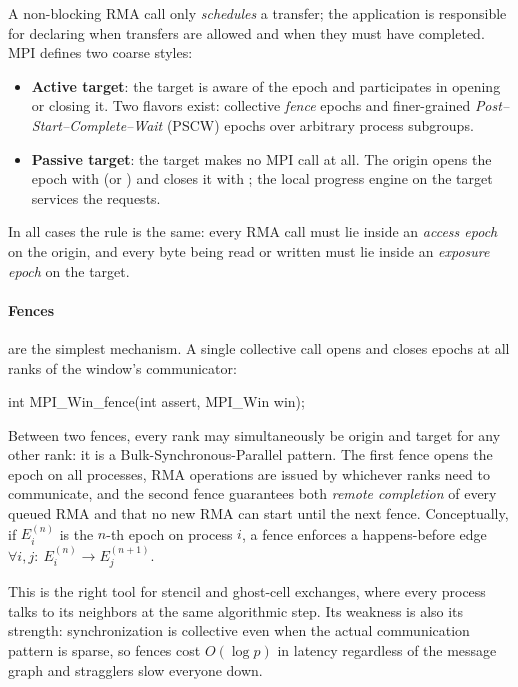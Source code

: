 A non-blocking RMA call only \emph{schedules} a transfer; the application is responsible for declaring when transfers are allowed and when they must have completed. MPI defines two coarse styles:

\begin{itemize}
    \item \textbf{Active target}: the target is aware of the epoch and participates in opening or closing it. Two flavors exist: collective \emph{fence} epochs and finer-grained \emph{Post--Start--Complete--Wait} (PSCW) epochs over arbitrary process subgroups.
    \item \textbf{Passive target}: the target makes no MPI call at all. The origin opens the epoch with  (or ) and closes it with ; the local progress engine on the target services the requests.
\end{itemize}

In all cases the rule is the same: every RMA call must lie inside an \emph{access epoch} on the origin, and every byte being read or written must lie inside an \emph{exposure epoch} on the target.

\paragraph{Fences} are the simplest mechanism. A single collective call opens and closes epochs at all ranks of the window's communicator:

\begin{codeblock}[language=C]
int MPI_Win_fence(int assert, MPI_Win win);
\end{codeblock}

Between two fences, every rank may simultaneously be origin and target for any other rank: it is a Bulk-Synchronous-Parallel pattern. The first fence opens the epoch on all processes, RMA operations are issued by whichever ranks need to communicate, and the second fence guarantees both \emph{remote completion} of every queued RMA and that no new RMA can start until the next fence. Conceptually, if $E_i^{(n)}$ is the $n$-th epoch on process $i$, a fence enforces a happens-before edge $\forall i,j:\ E_i^{(n)} \to E_j^{(n+1)}$.

This is the right tool for stencil and ghost-cell exchanges, where every process talks to its neighbors at the same algorithmic step. Its weakness is also its strength: synchronization is collective even when the actual communication pattern is sparse, so fences cost $O(\log p)$ in latency regardless of the message graph and stragglers slow everyone down.

